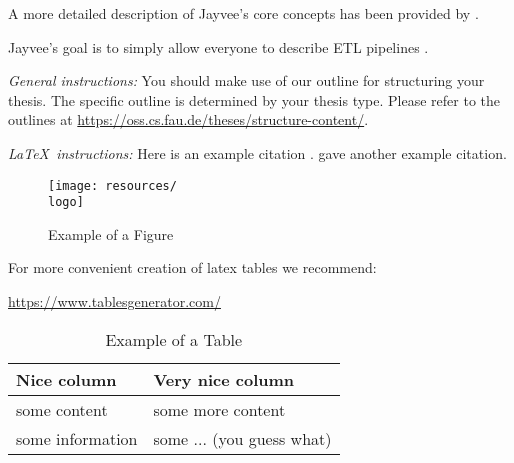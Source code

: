 A more detailed description of Jayvee's core concepts has been provided by \textcite{jvalue:jayvee:docs:core_concepts}.

Jayvee's goal is to simply allow everyone to describe ETL pipelines \autocite{jvalue:jayvee}.

\newpage

{\textsl{General instructions:}}
You should make use of our outline for structuring your
thesis. The specific outline is determined by your thesis type.
Please refer to the outlines at
\url{https://oss.cs.fau.de/theses/structure-content/}.

{\textsl{\LaTeX\ instructions:}} Here is an example citation
\autocite{riehle:2011:controlling}.
\textcite{riehle:2007:economic} gave another example citation.

\begin{figure}[ht]
	\texttt{[image: resources/\\logo]}
	\caption{Example of a Figure}
	\label{fig:example}
\end{figure}

For more convenient creation of latex tables we recommend:

\url{https://www.tablesgenerator.com/}

\begin{table}[ht]
	\caption{Example of a Table}
	\label{tab:example}
	\begin{tabular}{|l|l|}
		\hline
		Nice column      & Very nice column          \\
		\hline
		some content     & some more content         \\
		some information & some ... (you guess what) \\
		\hline
	\end{tabular}
\end{table}
